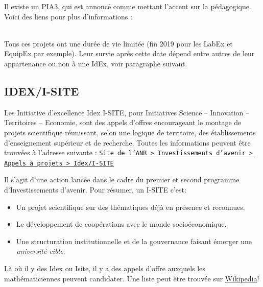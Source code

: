Il existe un PIA3, qui est annonc{\'e} comme mettant l'accent sur la p{\'e}dagogique.
Voici des liens pour plus d'informations : \\
 \\

Tous ces projets ont une dur{\'e}e de vie limit{\'e}e (fin 2019 pour les LabEx et EquipEx par exemple). 
Leur survie apr{\`e}s cette date d{\'e}pend entre autres de leur appartenance ou non {\`a} une IdEx, voir paragraphe suivant.

\subsection{IDEX/I-SITE}

Les Initiative d'excellence Idex I-SITE, pour Initiatives Science – Innovation –Territoires – Economie, sont des appels d'offres encourageant le montage de projets scientifique r\'eunissant, selon une logique de territoire, des \'etablissements d'enseignement sup\'erieur et de recherche. Toutes les informations
peuvent \^etre trouv\'ees \`a l'adresse suivante :
\href{http://www.agence-nationale-recherche.fr/investissements-d-avenir/appels-a-projets/2014/initiatives-dexcellence-idex-initiatives-science-innovation-territoires-economie-i-site/?L=jae}{%
\texttt{Site de l'ANR > Investissements d'avenir > Appels \`a projets > Idex/I-SITE}}

Il s'agit d’une action lanc{\'e}e dans le cadre du premier et second programme d'Investissements d’avenir. 
Pour r{\'e}sumer, un I-SITE c'est:
\begin{itemize}
 \item Un projet scientifique sur des th{\'e}matiques d{\'e}j{\`a} en pr{\'e}sence et reconnues.
 \item Le d{\'e}veloppement de coop{\'e}rations avec le monde socio{\'e}conomique.
 \item Une structuration institutionnelle et de la gouvernance faisant {\'e}merger une \textit{universit{\'e} cible}.
\end{itemize}

L{\`a} o{\`u} il y des Idex ou Isite, il y a des appels d'offre auxquels les math\'ematicien\mp nes peuvent candidater.
Une liste peut {\^e}tre trouv{\'e}e sur \href{https://fr.wikipedia.org/wiki/Initiative_d'excellence}{Wikipedia}!

